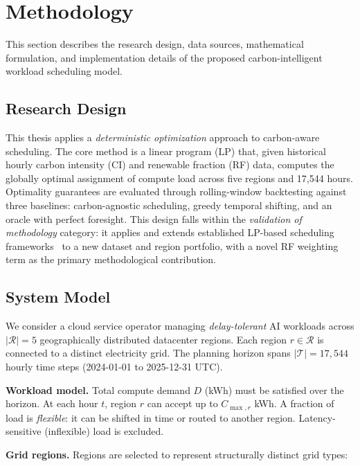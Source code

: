 \section{Methodology}
\label{sec:methodology}

This section describes the research design, data sources, mathematical formulation, and implementation details of the proposed carbon-intelligent workload scheduling model.

\subsection{Research Design}

This thesis applies a \emph{deterministic optimization} approach to carbon-aware scheduling.
The core method is a linear program (LP) that, given historical hourly carbon intensity (CI) and renewable fraction (RF) data, computes the globally optimal assignment of compute load across five regions and 17,544 hours.
Optimality guarantees are evaluated through rolling-window backtesting against three baselines: carbon-agnostic scheduling, greedy temporal shifting, and an oracle with perfect foresight.
This design falls within the \emph{validation of methodology} category: it applies and extends established LP-based scheduling frameworks~\cite{liu2012, riepin2024spatiotemporal} to a new dataset and region portfolio, with a novel RF weighting term as the primary methodological contribution.

\subsection{System Model}

We consider a cloud service operator managing \emph{delay-tolerant} AI workloads across $|\mathcal{R}| = 5$ geographically distributed datacenter regions.
Each region $r \in \mathcal{R}$ is connected to a distinct electricity grid.
The planning horizon spans $|\mathcal{T}| = 17{,}544$ hourly time steps (2024-01-01 to 2025-12-31 UTC).

\textbf{Workload model.}
Total compute demand $D$ (kWh) must be satisfied over the horizon.
At each hour $t$, region $r$ can accept up to $C_{\max,r}$ kWh.
A fraction of load is \emph{flexible}: it can be shifted in time or routed to another region.
Latency-sensitive (inflexible) load is excluded.

\textbf{Grid regions.}
Regions are selected to represent structurally distinct grid types:

